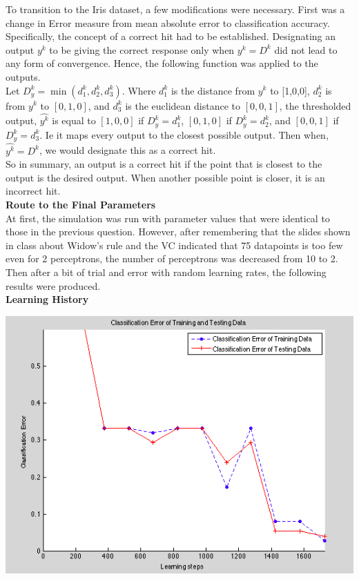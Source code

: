 \documentclass[epsfig]{article}
\begin{document}
 To transition to the Iris dataset, a few modifications were necessary. First was a change in Error measure from mean absolute error to classification accuracy. Specifically, the concept of a correct hit had to be established. Designating an output $y^k$ to be giving the correct response only when $y^k = D^k$ did not lead to any form of convergence. Hence, the following function was applied to the outputs. \\
 \newline
 Let $D_y^k = \min (d_1^k, d_2^k, d_3^k)$. Where $d_1^k$ is the distance from $y^k$ to [1,0,0], $d_2^k$ is from $y^k$ to $[0,1,0]$, and $d_3 ^ k$ is the euclidean distance to $[0,0,1]$, the thresholded output, $\hat{y^k}$ is equal to $[1,0,0]$ if $D_y^k = d_1 ^k$, $[0,1,0]$ if $D_y^k = d_2 ^k$, and $[0,0,1]$ if $D_y^k = d_3 ^k$. Ie it maps every output to the closest possible output. Then when, $\hat{y^k} = D^k$, we would designate this as a correct hit.\\
 \newline
 So in summary, an output is a correct hit if the point that is closest to the output is the desired output. When another possible point is closer, it is an incorrect hit.\\
 \newline
 \textbf{Route to the Final Parameters}\\
 At first, the simulation was run with parameter values that were identical to those in the previous question. However, after remembering that the slides shown in class about Widow's rule and the VC indicated that 75 datapoints is too few even for 2 perceptrons, the number of perceptrons was decreased from 10 to 2. Then after a bit of trial and error with random learning rates, the following results were produced.\\
 \textbf{Learning History}\\
\begin{center}
 \includegraphics[scale=0.7]{pic9.png}
\end{center}
\end{document}
